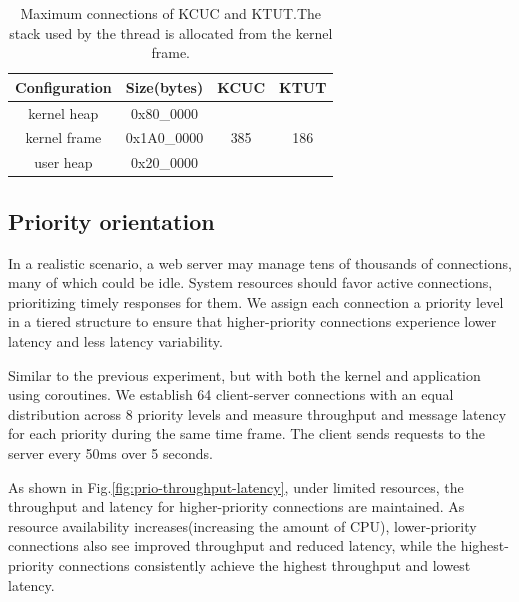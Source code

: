 \documentclass[conference]{IEEEtran}
\begin{document}
\begin{table}[htbp]
  \centering
  \begin{tabular}{cccc}
    \hline
    Configuration & Size(bytes) & KCUC & KTUT \\ \hline
    kernel heap   & 0x80\_0000  & \multirow{3}{*}{385} & \multirow{3}{*}{186} \\ 
    kernel frame  & 0x1A0\_0000  \\ 
    user heap     & 0x20\_0000   \\ 
    \hline
  \end{tabular}
  \caption{Maximum connections of KCUC and KTUT.\textnormal{The stack used by the thread is allocated from the kernel frame.}}
  \label{tab:mem_usage}
  \vspace{-1em}
\end{table}

\subsection{Priority orientation}

In a realistic scenario, a web server may manage tens of thousands of connections, many of which could be idle. System resources should favor active connections, prioritizing timely responses for them. We assign each connection a priority level in a tiered structure to ensure that higher-priority connections experience lower latency and less latency variability.

Similar to the previous experiment, but with both the kernel and application using coroutines. We establish 64 client-server connections with an equal distribution across 8 priority levels and measure throughput and message latency for each priority during the same time frame. The client sends requests to the server every 50ms over 5 seconds.

As shown in Fig.\ref{fig:prio-throughput-latency}, under limited resources, the throughput and latency for higher-priority connections are maintained. As resource availability increases(increasing the amount of CPU), lower-priority connections also see improved throughput and reduced latency, while the highest-priority connections consistently achieve the highest throughput and lowest latency.
\end{document}
